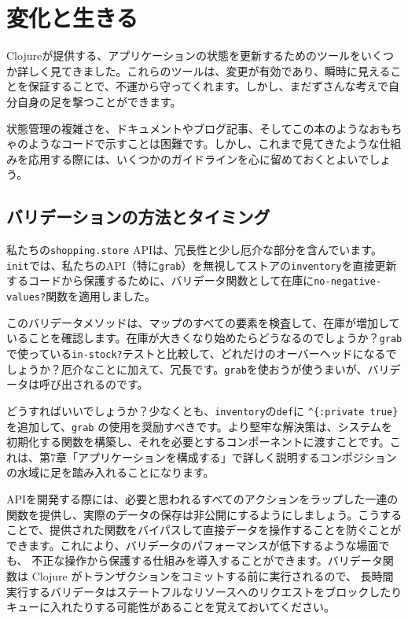 \section{変化と生きる}

Clojureが提供する、アプリケーションの状態を更新するためのツールをいくつか詳しく見てきました。これらのツールは、変更が有効であり、瞬時に見えることを保証することで、不運から守ってくれます。しかし、まだずさんな考えで自分自身の足を撃つことができます。

状態管理の複雑さを、ドキュメントやブログ記事、そしてこの本のようなおもちゃのようなコードで示すことは困難です。しかし、これまで見てきたような仕組みを応用する際には、いくつかのガイドラインを心に留めておくとよいでしょう。

\subsection{バリデーションの方法とタイミング}

私たちの\texttt{shopping.store} APIは、冗長性と少し厄介な部分を含んでいます。\texttt{init}では、私たちのAPI（特に\texttt{grab}）を無視してストアの\texttt{inventory}を直接更新するコードから保護するために、バリデータ関数として在庫に\texttt{no-negative-values?}関数を適用しました。

このバリデータメソッドは、マップのすべての要素を検査して、在庫が増加していることを確認します。在庫が大きくなり始めたらどうなるのでしょうか？\texttt{grab}で使っている\texttt{in-stock?}テストと比較して、どれだけのオーバーヘッドになるでしょうか？厄介なことに加えて、冗長です。\texttt{grab}を使おうが使うまいが、バリデータは呼び出されるのです。

どうすればいいでしょうか？少なくとも、\texttt{inventory}の\texttt{def}に \texttt{^\{:private true\}} を追加して、\texttt{grab} の使用を奨励すべきです。より堅牢な解決策は、システムを初期化する関数を構築し、それを必要とするコンポーネントに渡すことです。これは、第7章「アプリケーションを構成する」で詳しく説明するコンポジションの水域に足を踏み入れることになります。

APIを開発する際には、必要と思われるすべてのアクションをラップした一連の関数を提供し、実際のデータの保存は非公開にするようにしましょう。こうすることで、提供された関数をバイパスして直接データを操作することを防ぐことができます。これにより、バリデータのパフォーマンスが低下するような場面でも、 不正な操作から保護する仕組みを導入することができます。バリデータ関数は Clojure がトランザクションをコミットする前に実行されるので、 長時間実行するバリデータはステートフルなリソースへのリクエストをブロックしたり キューに入れたりする可能性があることを覚えておいてください。

